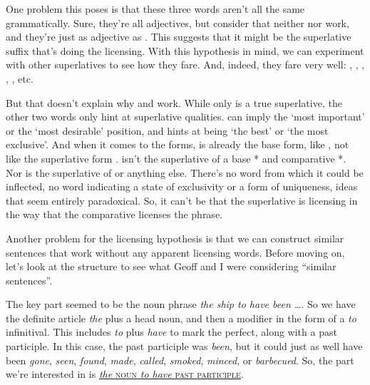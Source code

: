 \ea \label{ex:Rubyar-fixed}
    \z
\z

One problem this poses is that these three words aren't all the same grammatically. Sure, they're all adjectives, but consider that neither  nor  work, and they're just as adjective as . This suggests that it might be the superlative suffix  that's doing the licensing. With this hypothesis in mind, we can experiment with other superlatives to see how they fare. And, indeed, they fare very well: , , , , , etc.

But that doesn't explain why  and  work. While only  is a true superlative, the other two words only hint at superlative qualities.  can imply the `most important' or the `most desirable' position, and  hints at being `the best' or `the most exclusive'. And when it comes to the forms,  is already the base form, like , not like the superlative form .  isn't the superlative of a base * and comparative *. Nor is  the superlative of  or anything else. There's no word from which it could be inflected, no word indicating a state of  exclusivity or a  form of uniqueness, ideas that seem entirely paradoxical. So, it can't be that the superlative is licensing  in the way that the comparative licenses the  phrase.

Another problem for the licensing hypothesis is that we can construct similar sentences that work without any apparent licensing words. Before moving on, let's look at the structure to see what Geoff and I were considering \enquote{similar sentences}.

The key part seemed to be the noun phrase \textit{the ship to have been \dots}. So we have the definite article \textit{the} plus a head noun, and then a modifier in the form of a \textit{to} infinitival. This includes \textit{to} plus \textit{have} to mark the perfect, along with a past participle. In this case, the past participle was \textit{been}, but it could just as well have been \textit{gone}, \textit{seen}, \textit{found}, \textit{made}, \textit{called}, \textit{smoked}, \textit{minced}, or \textit{barbecued}. So, the part we're interested in is \uline{\textit{the} \textsc{noun} \textit{to have} \textsc{past participle}}.


